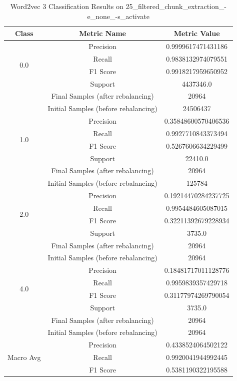 \begin{longtable}{|c|c|c|}
\caption{Word2vec 3 Classification Results on 25\_filtered\_chunk\_extraction\_-e\_none\_-s\_activate} \label{tab:25_filtered_chunk_extraction_-e_none_-s_activate_word2vec_3_classifiers_results} \\
\hline
Class & Metric Name & Metric Value \\
\hline
\multirow{4}{*}{0.0} & Precision & 0.9999617471431186 \\
 & Recall & 0.9838132974079551 \\
 & F1 Score & 0.9918217959650952 \\
 & Support & 4437346.0 \\
 & Final Samples (after rebalancing) & 20964 \\
 & Initial Samples (before rebalancing) & 24506437 \\
\hline
\multirow{4}{*}{1.0} & Precision & 0.35848600570406536 \\
 & Recall & 0.9927710843373494 \\
 & F1 Score & 0.5267606634229499 \\
 & Support & 22410.0 \\
 & Final Samples (after rebalancing) & 20964 \\
 & Initial Samples (before rebalancing) & 125784 \\
\hline
\multirow{4}{*}{2.0} & Precision & 0.19214470284237725 \\
 & Recall & 0.9954484605087015 \\
 & F1 Score & 0.32211392679228934 \\
 & Support & 3735.0 \\
 & Final Samples (after rebalancing) & 20964 \\
 & Initial Samples (before rebalancing) & 20964 \\
\hline
\multirow{4}{*}{4.0} & Precision & 0.18481717011128776 \\
 & Recall & 0.9959839357429718 \\
 & F1 Score & 0.31177974269790054 \\
 & Support & 3735.0 \\
 & Final Samples (after rebalancing) & 20964 \\
 & Initial Samples (before rebalancing) & 20964 \\
\hline
\multirow{4}{*}{Macro Avg} & Precision & 0.4338524064502122 \\
 & Recall & 0.9920041944992445 \\
 & F1 Score & 0.5381190322195588 \\

\end{longtable}
